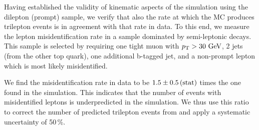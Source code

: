 Having established the validity of kinematic aspects of the \ttbar simulation using the dilepton (prompt) sample, we verify that also the rate at which the \ttbar MC produces trilepton events is in agreement with that rate in data. To this end, we measure the lepton misidentification rate in a sample dominated by semi-leptonic \ttbar decays. This sample is selected by requiring one tight muon with $p_{\mathrm{T}} > 30\,\,\text{Ge\hspace{-.08em}V}$, 2 jets (from the other top quark), one additional b-tagged jet, and a non-prompt lepton which is most likely misidentified.

We find the \ttbar misidentification rate in data to be $1.5 \pm 0.5\,\text{(stat)}$ times the one found in the \ttbar simulation. This indicates that the number of events with misidentified leptons is underpredicted in the \ttbar simulation. We thus use this ratio to correct the number of predicted trilepton events from \ttbar and apply a systematic uncertainty of 50\,\%.
